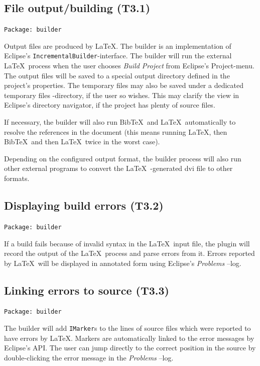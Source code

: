 \documentclass[a4paper,11pt,twoside]{article}
\begin{document}
\subsection{File output/building (T3.1)}
\label{sect:t3.1}

\texttt{Package: builder}

Output files are produced by \LaTeX. The builder is an implementation
of Eclipse's \texttt{IncrementalBuilder}-interface. The builder will
run the external \LaTeX\ process when the user chooses \emph{Build
  Project} from Eclipse's Project-menu. The output files will be
saved to a special output directory defined in the project's properties.
The temporary files may also be saved under a dedicated temporary files
-directory, if the user so wishes. This may clarify the view in Eclipse's
directory navigator, if the project has plenty of source files.

If necessary, the builder will also run Bib\TeX\ and \LaTeX\ automatically to 
resolve the references in the document (this means running \LaTeX, then 
Bib\TeX\ and then \LaTeX\ twice in the worst case).

Depending on the configured output format, the builder process will also run 
other external programs to convert the \LaTeX\ -generated dvi file to other 
formats.


\subsection{Displaying build errors (T3.2)}

\texttt{Package: builder}

If a build fails because of invalid syntax in the \LaTeX\ input file, the 
plugin will record the output of the \LaTeX\ process and parse errors from it. 
Errors reported by \LaTeX\ will be displayed in annotated form using Eclipse's 
\emph{Problems} --log.


\subsection{Linking errors to source (T3.3)}

\texttt{Package: builder}

The builder will add \texttt{IMarker}s to the lines of source files which
were reported to have errors by \LaTeX. Markers are automatically
linked to the error messages by Eclipse's API. The user can jump directly
to the correct position in the source by double-clicking the error message in
the \emph{Problems} --log.
\end{document}

